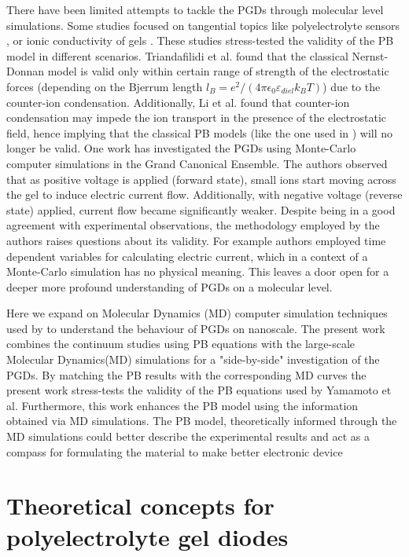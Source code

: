\documentclass[twoside,twocolumn,9pt]{article}
\begin{document}
There have been limited attempts to tackle the PGDs through molecular level simulations. Some studies focused on tangential topics like polyelectrolyte sensors \cite{Triandafilidi2018MolecularEffect}, or ionic conductivity of gels \cite{Li2016}. These studies stress-tested the validity of the PB model in different scenarios. Triandafilidi et al. \cite{Triandafilidi2018MolecularEffect} found that the classical Nernst-Donnan model is valid only within certain range of strength of the electrostatic forces (depending on the Bjerrum length $l_B = e^2/(4 \pi \epsilon_0\varepsilon_{diel}k_B T)$) due to the counter-ion condensation. Additionally, Li et al. \cite{Li2016} found that counter-ion condensation may impede the ion transport in the presence of the electrostatic field, hence implying that the classical PB models (like the one used in \cite{Yamamoto2014ElectrochemicalDiodes}) will no longer be valid. One work \cite{Lee2012Grand-canonicalDiode} has investigated the PGDs using Monte-Carlo computer simulations in the Grand Canonical Ensemble. The authors observed that as positive voltage is applied (forward state), small ions start moving across the gel to induce electric current flow. Additionally, with negative voltage (reverse state) applied, current flow became significantly weaker. Despite being in a good agreement with experimental observations, the methodology employed by the authors raises questions about its validity. For example authors employed time dependent variables  for calculating electric current, which in a context of a Monte-Carlo simulation has no physical meaning. This leaves a door open for a deeper more profound understanding of PGDs on a molecular level.


Here we expand on Molecular Dynamics (MD) computer simulation techniques used by \cite{Li2016,Triandafilidi2018MolecularEffect} to understand the behaviour of PGDs on nanoscale.  The present work combines the continuum studies using PB equations with the large-scale Molecular Dynamics(MD) simulations for a "side-by-side" investigation of the PGDs. By matching the PB results with the corresponding MD curves the present work stress-tests the validity of the PB equations used by Yamamoto et al. Furthermore, this work enhances the PB model using the information obtained via MD simulations. The PB model, theoretically informed through the MD simulations could better describe the experimental results and act as a compass for formulating the material to make better electronic device
\section{Theoretical concepts for polyelectrolyte gel diodes}
\label{theor_background}
\end{document}
